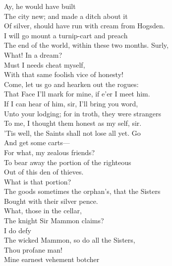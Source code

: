 \documentclass[a4paper,oneside,12pt]{memoir}
\begin{document}
\begin{drama*}
\facespeaks {} Ay, he would have built\\
The city new; and made a ditch about it\\
Of silver, should have run with cream from Hogsden.\\
\mammonspeaks I will go mount a turnip-cart and preach\\
The end of the world, within these two months. Surly,\\
What! In a dream?\\
\surlyspeaks {} Must I needs cheat myself,\\
With that same foolish vice of honesty!\\
Come, let us go and hearken out the rogues:\\
That Face I'll mark for mine, if e'er I meet him.\\
\facespeaks If I can hear of him, sir, I'll bring you word,\\
Unto your lodging; for in troth, they were strangers\\
To me, I thought them honest as my self, sir.\\
\tribulationspeaks 'Tis well, the Saints shall not lose all yet. Go\\
And get some carts---\\
\lovewitspeaks {} For what, my zealous friends?\\
\persecutionspeaks To bear away the portion of the righteous\\
Out of this den of thieves.\\
\lovewitspeaks {} What is that portion?\\
\persecutionspeaks The goods sometimes the orphan's, that the Sisters\\
Bought with their silver pence.\\
\lovewitspeaks {} What, those in the cellar,\\
The knight Sir Mammon claims?\\
\persecutionspeaks {} I do defy\\
The wicked Mammon, so do all the Sisters,\\
Thou profane man!\\
\lovewitspeaks {} Mine earnest vehement botcher\\

\end{drama*}
\end{document}
